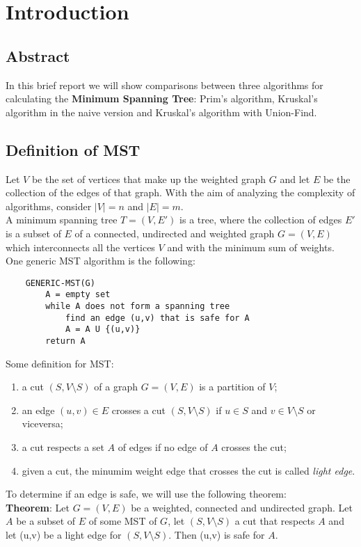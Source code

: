 \section{Introduction}

\subsection*{Abstract}
In this brief report we will show comparisons between three algorithms for calculating the \textbf{Minimum Spanning Tree}: Prim's algorithm, Kruskal's algorithm in the naive version and Kruskal's algorithm with Union-Find.

\subsection*{Definition of MST}
Let $V$ be the set of vertices that make up the weighted graph $G$ and let $E$ be the collection of the edges of that graph. With the aim of analyzing the complexity of algorithms, consider $|V| = n$ and $|E| = m$. \\
A minimum spanning tree $T = (V,E')$ is a tree, where the collection of edges $E'$ is a subset of $E$ of a connected, undirected and weighted graph $G = (V,E)$ which interconnects all the vertices $V$ and with the minimum sum of weights. \\
\noindent
One generic MST algorithm is the following: 
\begin{verbatim}
    GENERIC-MST(G)
        A = empty set
        while A does not form a spanning tree
            find an edge (u,v) that is safe for A
            A = A U {(u,v)}
        return A
\end{verbatim}
\noindent
Some definition for MST:
\begin{enumerate}
    \item a cut $(S, V \setminus S)$ of a graph $G = (V, E)$ is a partition of $V$;
    \item an edge $(u,v) \in E$ crosses a cut $(S, V \setminus S)$ if $u\in S$ and $v \in V \setminus S$ or viceversa;
    \item a cut respects a set $A$ of edges if no edge of $A$ crosses the cut;
    \item given a cut, the minumim weight edge that crosses the cut is called \textit{light edge}.
\end{enumerate}
\noindent
To determine if an edge is safe, we will use the following theorem: \\ \noindent
\textbf{Theorem}: Let $G = (V,E)$ be a weighted, connected and undirected graph. Let $A$ be a subset of $E$ of some MST of $G$, let $(S, V \setminus S)$ a cut that respects $A$ and let (u,v) be a light edge for $(S, V \setminus S)$. Then (u,v) is safe for $A$.